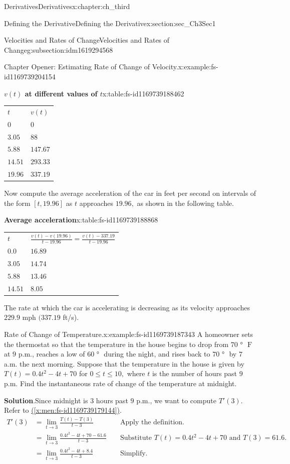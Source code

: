 \documentclass[oneside,10pt,]{book}
\newcommand{\blocktitlefont}{\relax}
\newcommand{\tabularfont}{\relax}
\newcommand{\xreffont}{\relax}
\numberwithin{equation}{section}
\newcommand{\amp}{&}
\begin{document}
\begin{chapterptx}{Derivatives}{}{Derivatives}{}{}{x:chapter:ch_third}
\begin{sectionptx}{Defining the Derivative}{}{Defining the Derivative}{}{}{x:section:sec_Ch3Sec1}
\begin{subsectionptx}{Velocities and Rates of Change}{}{Velocities and Rates of Change}{}{}{g:subsection:idm1619294568}
\begin{example}{Chapter Opener: Estimating Rate of Change of Velocity.}{x:example:fs-id1169739204154}
\begin{tableptx}{\textbf{\(v(t)\) at different values of \(t\)}}{x:table:fs-id1169739188462}{}
{\begin{tabular}{ll}
\textbf{\(t\)}&\textbf{\(v(t)\)}\tabularnewline[0pt]
\(0\)&\(0\)\tabularnewline[0pt]
\(3.05\)&\(88\)\tabularnewline[0pt]
\(5.88\)&\(147.67\)\tabularnewline[0pt]
\(14.51\)&\(293.33\)\tabularnewline[0pt]
\(19.96\)&\(337.19\)
\end{tabular}
}%
\end{tableptx}%
Now compute the average acceleration of the car in feet per second on intervals of the form \([t,19.96]\) as \(t\) approaches \(19.96,\) as shown in the following table.%
\begin{tableptx}{\textbf{Average acceleration}}{x:table:fs-id1169739188868}{}%
\centering%
{\tabularfont%
\begin{tabular}{ll}
\textbf{\(t\)}&\textbf{\(\frac{v(t)-v(19.96)}{t-19.96}=\frac{v(t)-337.19}{t-19.96}\)}\tabularnewline[0pt]
\(0.0\)&\(16.89\)\tabularnewline[0pt]
\(3.05\)&\(14.74\)\tabularnewline[0pt]
\(5.88\)&\(13.46\)\tabularnewline[0pt]
\(14.51\)&\(8.05\)
\end{tabular}
}%
\end{tableptx}%
The rate at which the car is accelerating is decreasing as its velocity approaches \(229.9\) mph \((337.19\) ft\slash{}s).%
\end{example}
\begin{example}{Rate of Change of Temperature.}{x:example:fs-id1169739187343}%
A homeowner sets the thermostat so that the temperature in the house begins to drop from \(70\text{ ° }\text{ F }\) at \(9\) p.m., reaches a low of \(60\text{ ° }\) during the night, and rises back to \(70\text{ ° }\) by \(7\) a.m. the next morning. Suppose that the temperature in the house is given by \(T(t)=0.4t^2-4t+70\) for \(0 \leq  t \leq  10,\) where \(t\) is the number of hours past \(9\) p.m. Find the instantaneous rate of change of the temperature at midnight.%
\par\smallskip%
\noindent\textbf{\blocktitlefont Solution}.\hypertarget{g:solution:idm1619210216}{}\quad{}Since midnight is \(3\) hours past \(9\) p.m., we want to compute \(T'(3).\) Refer to \hyperref[x:men:fs-id1169739179144]{({\xreffont\ref{x:men:fs-id1169739179144}})}.%
%
\begin{align*}
T'(3)\amp=\lim_{t\to 3}\frac{T(t)-T(3)}{t-3}\amp\amp\text{ Apply the definition. }\\
\amp=\lim_{t\to 3}\frac{0.4t^2-4t+70-61.6}{t-3}\amp\amp\text{ Substitute } T(t)=0.4t^2-4t+70 \text{ and }T(3)=61.6.\\
\amp=\lim_{t\to 3}\frac{0.4t^2-4t+8.4}{t-3}\amp\amp\text{ Simplify. }\\

\end{align*}
\end{example}
\end{subsectionptx}
\end{sectionptx}
\end{chapterptx}
\end{document}
